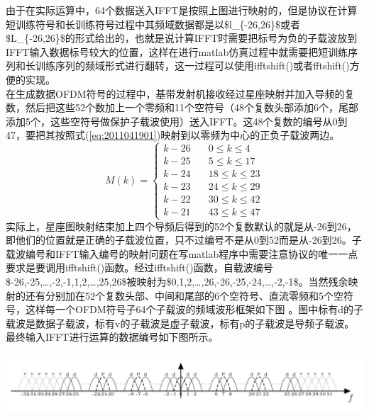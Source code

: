 \documentclass[10pt,a4paper,UTF8]{article}
\begin{document}
由于在实际运算中，64个数据送入IFFT是按照上图进行映射的，但是协议在计算短训练符号和长训练符号过程中其频域数据都是以\$l\_\{-26,26\}\$或者\$L\_\{-26,26\}\$的形式给出的，也就是说计算IFFT时需要把标号为负的子载波放到IFFT输入数据标号较大的位置，这样在进行matlab仿真过程中就需要把短训练序列和长训练序列的频域形式进行翻转，这一过程可以使用ifftshift()或者fftshift()方便的实现。\\

在生成数据OFDM符号的过程中，基带发射机接收经过星座映射并加入导频的复数，然后把这些52个数加上一个零频和11个空符号（48个复数头部添加6个，尾部添加5个，这些空符号做保护子载波使用）送入IFFT。这48个复数的编号从0到47，要把其按照式(\ref{eq:2011041901})映射到以零频为中心的正负子载波两边。
\begin{equation}
M(k)= \left\{ \begin{array}{ll}
  k-26 & \textrm{$\quad 0\leq k\leq 4$}\\
  k-25 & \textrm{$\quad 5\leq k\leq 17$}\\
  k-24 & \textrm{$\quad 18\leq k\leq 23$}\\
  k-23 & \textrm{$\quad 24\leq k\leq 29$}\\
  k-22 & \textrm{$\quad 30\leq k\leq 42$}\\
  k-21 & \textrm{$\quad 43\leq k\leq 47$}
  \end{array} \right.
 \label{eq:2011041901}
\end{equation}
实际上，星座图映射结束加上四个导频后得到的52个复数默认的就是从-26到26，即他们的位置就是正确的子载波位置，只不过编号不是从0到52而是从-26到26。子载波编号和IFFT输入编号的映射问题在写matlab程序中需要注意协议的唯一一点要求是要调用ifftshift()函数。经过ifftshift()函数，自载波编号\$-26,-25,\ldots,-2,-1,1,2,\ldots,25,26\$被映射为\$0,1,2,\ldots,26,-26,-25,-24,\ldots,-2,-1\$。当然残余映射的还有分别加在52个复数头部、中间和尾部的6个空符号、直流零频和5个空符号，这样每一个OFDM符号子64个子载波的频域波形框架如下图 。图中标有d的子载波是数据子载波，标有v的子载波是虚子载波，标有p的子载波是导频子载波。最终输入IFFT进行运算的数据编号如下图所示。

\begin{center}
\includegraphics[width=.9\linewidth]{../../img/communication_protocol/2017101864fft.png}
\end{center}
\end{document}
